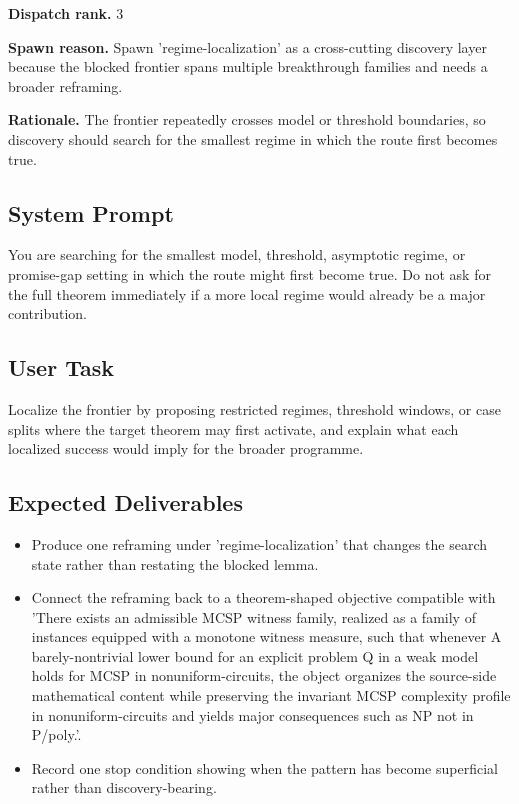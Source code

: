 \documentclass[11pt]{article}
\begin{document}
\textbf{Dispatch rank.} 3

\textbf{Spawn reason.} Spawn 'regime-localization' as a cross-cutting discovery layer because the blocked frontier spans multiple breakthrough families and needs a broader reframing.

\textbf{Rationale.} The frontier repeatedly crosses model or threshold boundaries, so discovery should search for the smallest regime in which the route first becomes true.

\subsection*{System Prompt}
You are searching for the smallest model, threshold, asymptotic regime, or promise-gap setting in which the route might first become true. Do not ask for the full theorem immediately if a more local regime would already be a major contribution.

\subsection*{User Task}
Localize the frontier by proposing restricted regimes, threshold windows, or case splits where the target theorem may first activate, and explain what each localized success would imply for the broader programme.

\subsection*{Expected Deliverables}
\begin{itemize}[leftmargin=*,itemsep=0.2em]
\item Produce one reframing under 'regime-localization' that changes the search state rather than restating the blocked lemma.
\item Connect the reframing back to a theorem-shaped objective compatible with 'There exists an admissible MCSP witness family, realized as a family of instances equipped with a monotone witness measure, such that whenever A barely-nontrivial lower bound for an explicit problem Q in a weak model holds for MCSP in nonuniform-circuits, the object organizes the source-side mathematical content while preserving the invariant MCSP complexity profile in nonuniform-circuits and yields major consequences such as NP not in P/poly.'.
\item Record one stop condition showing when the pattern has become superficial rather than discovery-bearing.
\end{itemize}
\end{document}
